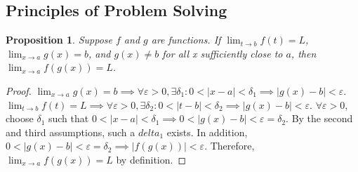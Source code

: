 \documentclass{article}
\newtheorem*{proposition*}{Proposition}
\begin{document}
\subsection*{Principles of Problem Solving}
\begin{proposition*}
  Suppose $f$ and $g$ are functions. If $\lim_{t \to b}f(t)=L$, $\lim_{x \to a}g(x)=b$, and $g(x)
    \neq b$ for all x sufficiently close to $a$, then $\lim_{x \to a}f\left(g(x)\right)=L$.
\end{proposition*}
\begin{proof}
  $\lim_{x \to a}g(x)=b\implies\forall\varepsilon>0, \exists\delta_1:0<|x-a|<\delta_1\implies
    |g(x)-b|<\varepsilon$. $\lim_{t \to b}f(t)=L\implies\forall\varepsilon>0, \exists\delta_2:0<|t-
    b|<\delta_2\implies|g(x)-b|<\varepsilon$. $\forall\varepsilon>0$, choose $\delta_1$ such that
  $0<|x-a|<\delta_1\implies0<|g(x)-b|<\varepsilon=\delta_2$. By the second and third assumptions,
  such a $delta_1$ exists. In addition, $0<|g(x)-b|<\varepsilon=\delta_2\implies\left|f\left(
    g(x)\right)\right|<\varepsilon$. Therefore, $\lim_{x \to a}f\left(g(x)\right)=L$ by definition.
\end{proof}
\end{document}
